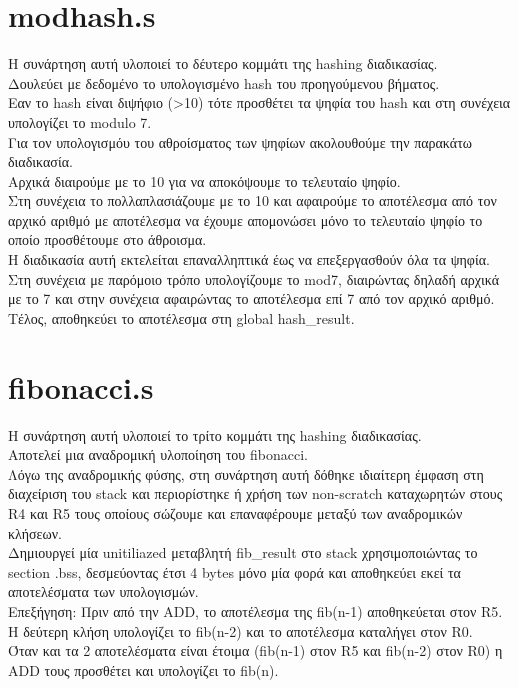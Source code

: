 \documentclass{article}
\begin{document}
\section{modhash.s}
Η συνάρτηση αυτή υλοποιεί το δέυτερο κομμάτι της hashing διαδικασίας. \\
Δουλεύει με δεδομένο το υπολογισμένο hash του προηγούμενου βήματος. \\
Εαν το hash είναι διψήφιο (>10) τότε προσθέτει τα ψηφία του hash και στη συνέχεια υπολογίζει το modulo 7. \\
Για τον υπολογισμόυ του αθροίσματος των ψηφίων ακολουθούμε την παρακάτω διαδικασία. \\
Αρχικά διαιρούμε με το 10 για να αποκόψουμε το τελευταίο ψηφίο. \\
Στη συνέχεια το πολλαπλασιάζουμε με το 10 και αφαιρούμε το αποτέλεσμα από τον αρχικό αριθμό με αποτέλεσμα να έχουμε απομονώσει μόνο το τελευταίο ψηφίο το οποίο προσθέτουμε στο άθροισμα. \\
Η διαδικασία αυτή εκτελείται επαναλληπτικά έως να επεξεργασθούν όλα τα ψηφία. \\
Στη συνέχεια με παρόμοιο τρόπο υπολογίζουμε το mod7, διαιρώντας δηλαδή αρχικά με το 7 και στην συνέχεια αφαιρώντας το αποτέλεσμα επί 7 από τον αρχικό αριθμό. \\
Τέλος, αποθηκεύει το αποτέλεσμα στη global hash\_result. \\

\section{fibonacci.s}
Η συνάρτηση αυτή υλοποιεί το τρίτο κομμάτι της hashing διαδικασίας. \\
Αποτελεί μια αναδρομική υλοποίηση του fibonacci. \\
Λόγω της αναδρομικής φύσης, στη συνάρτηση αυτή δόθηκε ιδιαίτερη έμφαση στη διαχείριση του stack και περιορίστηκε ή χρήση των non-scratch καταχωρητών στους R4 και R5 τους οποίους σώζουμε και επαναφέρουμε μεταξύ των αναδρομικών κλήσεων. \\
Δημιουργεί μία unitiliazed μεταβλητή fib\_result στο stack χρησιμοποιώντας το section .bss, δεσμεύοντας έτσι 4 bytes μόνο μία φορά και αποθηκεύει εκεί τα αποτελέσματα των υπολογισμών. \\

Επεξήγηση: Πριν από την ADD, το αποτέλεσμα της fib(n-1) αποθηκεύεται στον R5. \\ 
Η δεύτερη κλήση υπολογίζει το fib(n-2) και το αποτέλεσμα καταλήγει στον R0. \\
Όταν και τα 2 αποτελέσματα είναι έτοιμα (fib(n-1) στον R5 και fib(n-2) στον R0) η ADD τους προσθέτει και υπολογίζει το fib(n). \\
\end{document}
